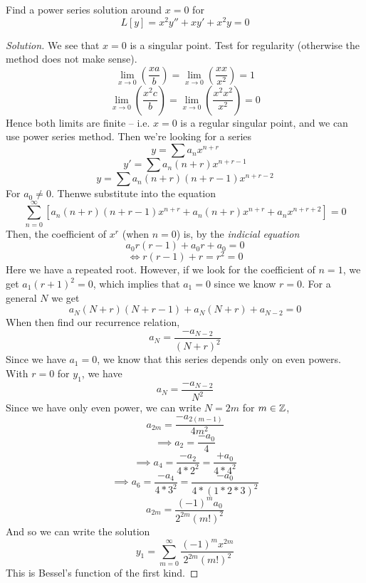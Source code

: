 \begin{example}
  Find a power series solution around $x=0$ for 
  \[L[y]=x^2y'' + xy' + x^2 y = 0\]
\end{example}
\begin{proof}[Solution]
  We see that $x=0$ is a singular point. Test for regularity (otherwise the method does
  not make sense).
  \[\lim_{x\to 0} (\frac{x a}{b}) = \lim_{x\to 0} (\frac{x x}{x^2}) = 1\]
  \[\lim_{x\to 0} (\frac{x^2 c}{b}) = \lim_{x\to 0} (\frac{x^2 x^2}{x^2}) = 0\]
  Hence both limits are finite -- i.e. $x=0$ is a regular singular point, and we can use
  power series method. Then we're looking for a series
  \[y = \sum a_n x^{n+r}\]
  \[y' = \sum a_n(n+r) x^{n+r-1}\]
  \[y = \sum a_n(n+r)(n+r-1) x^{n+r-2}\]
  For $a_0\neq 0$. Thenwe substitute into the equation
  \[\sum_{n=0}^{\infty} [a_n(n+r)(n+r-1)x^{n+r} + a_n (n+r) x^{n+r} + a_n x^{n+r+2} ]= 0\]
  Then, the coefficient of $x^r$ (when $n=0$) is, by the \emph{indicial equation}
  \[a_0 r (r-1) + a_0 r + a_0 = 0\]
  \[\iff r(r-1) + r = r^2= 0\]
  Here we have a repeated root. However, if we look for the coefficient of $n=1$, we get
  $a_1(r+1)^2 =0$, which implies that $a_1=0$ since we know $r=0$. For a general $N$ we
  get
  \[a_N (N+r)(N+r-1) + a_N (N+r) + a_{N-2} = 0\]
  When then find our recurrence relation,
  \[a_N = \frac{-a_{N-2}}{(N+r)^2}\]
  Since we have $a_1=0$, we know that this series depends only on even powers. With $r=0$
  for $y_1$, we have
  \[a_N = \frac{-a_{N-2}}{N^2}\]
  Since we have only even power, we can write $N=2m$ for $m\in\mathbb Z$,
  \[a_{2m} = \frac{-a_{2(m-1)}}{4m^2}\]
  \[\implies a_{2} = \frac{-a_{0}}{4}\]
  \[\implies a_{4} = \frac{-a_{2}}{4*2^2} = \frac{+a_0}{4 * 4^2}\]
  \[\implies a_{6} = \frac{-a_{4}}{4 * 3^2} = \frac{-a_0}{4* (1*2*3)^2}\]
  \[a_{2m} = \frac{(-1)^m a_0}{2^{2m} (m!)^2}\]
  And so we can write the solution
  \[y_1 = \sum_{m=0}^{\infty} \frac{(-1)^m x^{2m}}{2^{2m}(m!)^2}\]
  This is Bessel's function of the first kind.


\end{proof}

